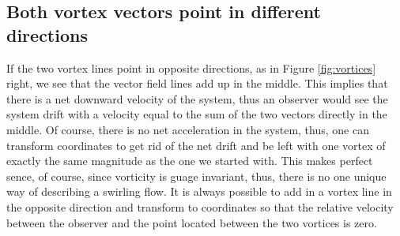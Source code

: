 \documentclass[english]{article}
\begin{document}
\subsection{Both vortex vectors point in different directions}
If the two vortex lines point in opposite directions, as in Figure 
\ref{fig:vortices} right, we see that the vector field lines add up in the
middle.
This implies that there is a net downward velocity of the system, thus
an observer would see the system drift with a velocity equal to the sum 
of the two vectors directly in the middle.
Of course, there is no net acceleration in the system, thus, one can
transform coordinates to get rid of the net drift and be left with one
vortex of exactly the same magnitude as the one we started with.
This makes perfect sence, of course, since vorticity is guage invariant, 
thus, there is no one unique way of describing a swirling flow.
It is always possible to add in a vortex line in the opposite direction
and transform to coordinates so that the relative velocity between the
observer and the point located between the two vortices is zero.
\end{document}
